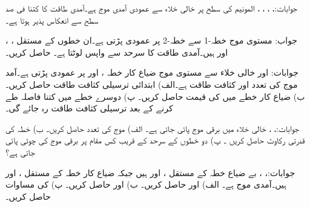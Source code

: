 جوابات:، ، ،
 ، 
المونیم کی سطح  پر خالی خلاء سے عمودی آمدی موج  ہے۔آمدی طاقت کا کتنا فی صد سطح سے انعکاس پذیر ہوتا ہے۔

جواب:
مستوی موج خطہ-1 سے خطہ-2 پر عمودی پڑتی ہے۔ان خطوں کے مستقل ، ، اور
  ہیں۔آمدی طاقت کا  سرحد سے واپس لوٹتا ہے۔ حاصل کریں۔

جوابات: اور 
خالی خلاء سے مستوی موج ضیاع کار خطہ ،  اور  پر عمودی پڑتی ہے۔آمد موج کی تعدد  اور کثافت طاقت  ہے۔الف) ابتدائی ترسیلی کثافت طاقت حاصل کریں۔ ب) ضیاع کار خطے میں  کی قیمت حاصل کریں۔ پ) دوسرے خطے میں کتنا فاصلہ طے کرنے کے بعد ترسیلی کثافت طاقت  رہ جائے گی۔

جوابات:، ، 
خالی خلاء  میں برقی موج  پائی جاتی ہے۔ الف) موج کی تعدد حاصل کریں۔ ب) خطہ   کی قدرتی رکاوٹ حاصل کریں ۔ پ) دو خطوں کے سرحد کے قریب کس مقام پر برقی موج کی چوٹی پائی جاتی ہے؟

جوابات:، ، 
بے ضیاع خطہ  کے مستقل ،  اور  ہیں جبکہ ضیاع کار خطہ  کے مستقل ،  اور  ہیں۔آمدی موج  ہے۔ الف)  اور  حاصل کریں۔ ب)  اور
  حاصل کریں۔ پ)  کی مساوات حاصل کریں۔

